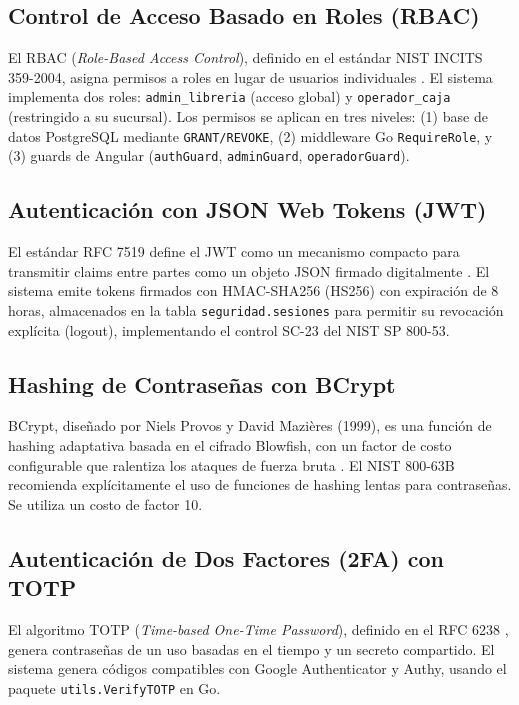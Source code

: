 \documentclass[12pt,a4paper,oneside]{report}
\begin{document}
\subsection{Control de Acceso Basado en Roles (RBAC)}

El RBAC (\textit{Role-Based Access Control}), definido en el estándar NIST INCITS 359-2004, asigna permisos a roles en lugar de usuarios individuales \cite{nist_rbac}. El sistema implementa dos roles: \texttt{admin\_libreria} (acceso global) y \texttt{operador\_caja} (restringido a su sucursal). Los permisos se aplican en tres niveles: (1) base de datos PostgreSQL mediante \texttt{GRANT/REVOKE}, (2) middleware Go \texttt{RequireRole}, y (3) guards de Angular (\texttt{authGuard}, \texttt{adminGuard}, \texttt{operadorGuard}).

\subsection{Autenticación con JSON Web Tokens (JWT)}

El estándar RFC 7519 define el JWT como un mecanismo compacto para transmitir claims entre partes como un objeto JSON firmado digitalmente \cite{rfc7519}. El sistema emite tokens firmados con HMAC-SHA256 (HS256) con expiración de 8 horas, almacenados en la tabla \texttt{seguridad.sesiones} para permitir su revocación explícita (logout), implementando el control SC-23 del NIST SP 800-53.

\subsection{Hashing de Contraseñas con BCrypt}

BCrypt, diseñado por Niels Provos y David Mazières (1999), es una función de hashing adaptativa basada en el cifrado Blowfish, con un factor de costo configurable que ralentiza los ataques de fuerza bruta \cite{provos1999}. El NIST 800-63B recomienda explícitamente el uso de funciones de hashing lentas para contraseñas. Se utiliza un costo de factor 10.

\subsection{Autenticación de Dos Factores (2FA) con TOTP}

El algoritmo TOTP (\textit{Time-based One-Time Password}), definido en el RFC 6238 \cite{rfc6238}, genera contraseñas de un uso basadas en el tiempo y un secreto compartido. El sistema genera códigos compatibles con Google Authenticator y Authy, usando el paquete \texttt{utils.VerifyTOTP} en Go.
\end{document}
